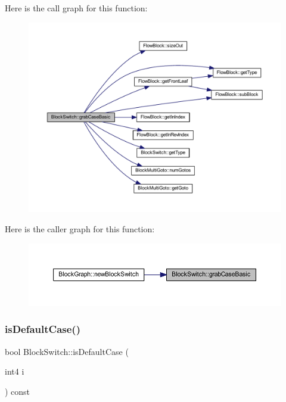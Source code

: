 Here is the call graph for this function\+:
\nopagebreak
\begin{figure}[H]
\begin{center}
\leavevmode
\includegraphics[width=350pt]{class_block_switch_ab6767a24f3c49d93a880e101ccef4b7f_cgraph}
\end{center}
\end{figure}
Here is the caller graph for this function\+:
\nopagebreak
\begin{figure}[H]
\begin{center}
\leavevmode
\includegraphics[width=350pt]{class_block_switch_ab6767a24f3c49d93a880e101ccef4b7f_icgraph}
\end{center}
\end{figure}
\mbox{\label{class_block_switch_a952906ee6ff751cb66e365e0e78f165c}} 
\subsubsection{\texorpdfstring{isDefaultCase()}{isDefaultCase()}}
{\footnotesize\ttfamily bool Block\+Switch\+::is\+Default\+Case (\begin{DoxyParamCaption}\item[{int4}]{i }\end{DoxyParamCaption}) const\hspace{0.3cm}{\ttfamily [inline]}}




